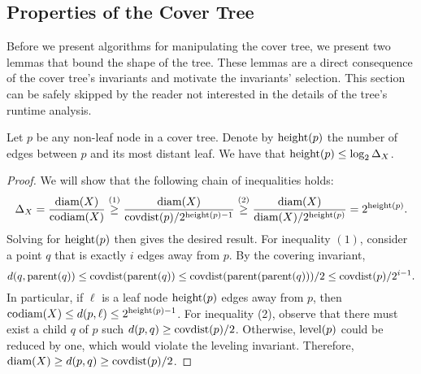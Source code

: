 \documentclass[../main.tex]{subfiles}
\newcommand{\dist}[2]{\distf({#1},{#2})}
\newcommand{\distf}{d}
\newcommand{\diam}[1]{\textnormal{diam}({#1})}
\newcommand{\codiam}[1]{\textnormal{codiam}({#1})}
\newcommand{\aspect}[1]{\Delta_{#1}}
\newcommand{\mkfunction}[1]{\ifmmode{\textnormal{{#1}}}}
\newcommand{\level}[1]      {\mkfunction{level}({#1})}
\newcommand{\parent}[1]     {\mkfunction{parent}({#1})}
\newcommand{\covdist}[1]    {\mkfunction{covdist}({#1})}
\newcommand{\maxdist}[1]    {\mkfunction{maxdist}({#1})}
\newcommand{\height}[1]     {\mkfunction{height}({#1})}
\begin{document}

\subsection{Properties of the Cover Tree}

Before we present algorithms for manipulating the cover tree, 
we present two lemmas that bound the shape of the tree.
These lemmas are a direct consequence of the cover tree's invariants and motivate the invariants' selection.
This section can be safely skipped by the reader not interested in the details of the tree's runtime analysis.


%


\begin{lemma}
    \label{lemma:height}
    Let $p$ be any non-leaf node in a cover tree.
    Denote by $\height{p}$ the number of edges between $p$ and its most distant leaf.
    We have that $\height{p} \le \log_2\aspect{X}$.
\end{lemma}

\begin{proof}
    We will show that the following chain of inequalities holds:
    \begin{equation}
        \aspect{X} 
        = \frac{\diam{X}}{\codiam{X}} 
        \overset{(1)}\ge \frac{\diam{X}}{\covdist{p}/2^{\height p-1}} 
        \overset{(2)}\ge \frac{\diam{X}}{\diam{X}/2^{\height p}} 
        = 2^{\height p}
        .
    \end{equation}
    Solving for $\height p$ then gives the desired result.
    For inequality $(1)$, consider a point $q$ that is exactly $i$ edges away from $p$.
    By the covering invariant, 
    \begin{equation}
        \dist{q}{\parent{q}} 
        \le 
        \covdist{\parent{q}}
        \le 
        \covdist{\parent{\parent{q}}}/2
        \le
        \covdist{p}/2^{i-1}
        .
    \end{equation}
    In particular, if $\ell$ is a leaf node $\height p$ edges away from $p$,
    then $\codiam{X}\le\dist{p}{\ell}\le2^{\height p-1}$.
    For inequality (2), observe that there must exist a child $q$ of $p$ such $\dist{p}{q} \ge \covdist{p}/2$.
    Otherwise, $\level p$ could be reduced by one, which would violate the leveling invariant.
    Therefore, $\diam{X} \ge \dist{p}{q} \ge \covdist{p}/2$.
\end{proof}
\end{document}
